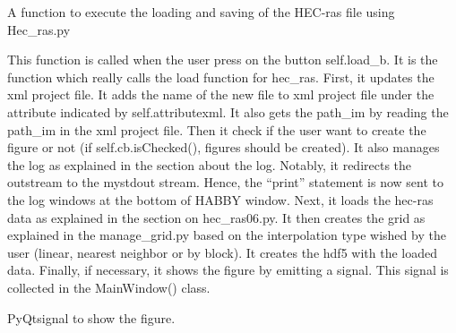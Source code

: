 \documentclass[letterpaper,10pt,english]{sphinxmanual}
\begin{document}
\begin{fulllineitems}

\begin{fulllineitems}
\label{\detokenize{index:src_GUI.hydro_GUI_2.HEC_RAS1D.load_hec_ras_gui}}
A function to execute the loading and saving of the HEC-ras file using Hec\_ras.py


This function is called when the user press on the button self.load\_b. It is the function which really
calls the load function for hec\_ras. First, it updates the xml project file. It adds the name of the new file
to xml project file under the attribute indicated by self.attributexml. It also gets the path\_im by reading the
path\_im in the xml project file. Then it check if the user want to create the figure or not
(if self.cb.isChecked(), figures should be created). It also manages the log as explained in the section
about the log. Notably, it redirects the  outstream to the mystdout stream. Hence, the “print” statement is
now sent to the log windows at the bottom of HABBY window. Next, it loads the hec-ras data as explained in
the section on hec\_ras06.py. It then creates the grid as explained in the manage\_grid.py based on the
interpolation type wished by the user (linear, nearest neighbor or by block). It creates the hdf5
with the loaded data. Finally, if necessary, it shows the figure by emitting a signal.
This signal is collected in the MainWindow() class.

\end{fulllineitems}


\begin{fulllineitems}
\label{\detokenize{index:src_GUI.hydro_GUI_2.HEC_RAS1D.show_fig}}
PyQtsignal to show the figure.

\end{fulllineitems}


\end{fulllineitems}

\end{document}
